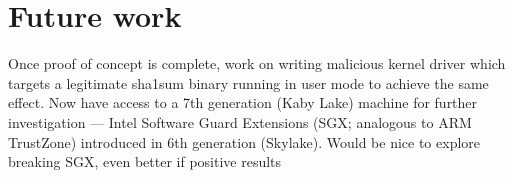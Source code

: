 \section{Future work}

Once proof of concept is complete, work on writing malicious kernel driver
which targets a legitimate sha1sum binary running in user mode to achieve the
same effect.
Now have access to a 7th generation (Kaby Lake) machine for further
investigation — Intel Software Guard Extensions (SGX; analogous to ARM
TrustZone) introduced in 6th generation (Skylake).
Would be nice to explore breaking SGX, even better if positive results
